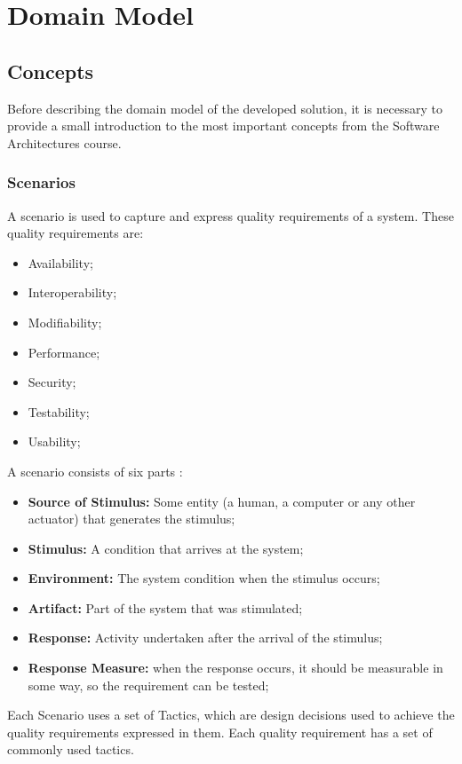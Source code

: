 \chapter{Domain Model}
\label{chapter:domainModel}

\section{Concepts}
\label{section:SAConcepts}
Before describing the domain model of the developed solution, it is necessary to provide a small introduction to the most important concepts from the Software Architectures course.
\subsection{Scenarios}
A scenario is used to capture and express quality requirements of a system. These quality requirements are:
\begin{itemize}
\item Availability;
\item Interoperability;
\item Modifiability;
\item Performance;
\item Security;
\item Testability;
\item Usability;
\end{itemize}

A scenario consists of six parts \cite{bass2003software}:
\begin{itemize}
\item \textbf{Source of Stimulus:} Some entity (a human, a computer or any other actuator) that generates the stimulus;
\item \textbf{Stimulus:} A condition that arrives at the system;
\item \textbf{Environment:} The system condition when the stimulus occurs;
\item \textbf{Artifact:} Part of the system that was stimulated;
\item \textbf{Response:} Activity undertaken after the arrival of the stimulus;
\item \textbf{Response Measure:} when the response occurs, it should be measurable in some way, so the requirement can be tested;
\end{itemize}

Each Scenario uses a set of Tactics, which are design decisions used to achieve the quality requirements expressed in them. Each quality requirement has a set of commonly used tactics.


